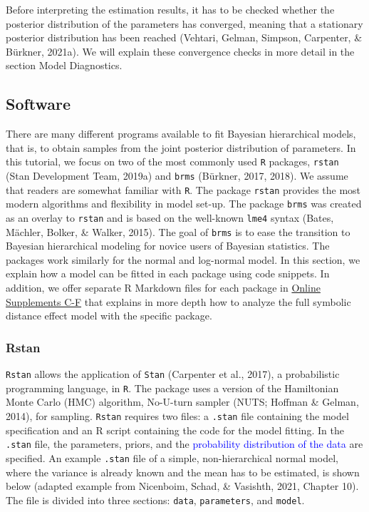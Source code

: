 \documentclass[
  english,
  doc,floatsintext]{apa6}
\begin{document}
Before interpreting the estimation results, it has to be checked whether the posterior distribution of the parameters has converged, meaning that a stationary posterior distribution has been reached (Vehtari, Gelman, Simpson, Carpenter, \& Bürkner, 2021a). We will explain these convergence checks in more detail in the section Model Diagnostics.

\hypertarget{software}{%
\subsection{Software}\label{software}}

There are many different programs available to fit Bayesian hierarchical models, that is, to obtain samples from the joint posterior distribution of parameters. In this tutorial, we focus on two of the most commonly used \texttt{R} packages, \texttt{rstan} (Stan Development Team, 2019a) and \texttt{brms} (Bürkner, 2017, 2018). We assume that readers are somewhat familiar with \texttt{R}. The package \texttt{rstan} provides the most modern algorithms and flexibility in model set-up. The package \texttt{brms} was created as an overlay to \texttt{rstan} and is based on the well-known \texttt{lme4} syntax (Bates, Mächler, Bolker, \& Walker, 2015). The goal of \texttt{brms} is to ease the transition to Bayesian hierarchical modeling for novice users of Bayesian statistics. The packages work similarly for the normal and log-normal model. In this section, we explain how a model can be fitted in each package using code snippets. In addition, we offer separate R Markdown files for each package in \href{https://github.com/MyrtheV/Bayesian-Hierarchical-Modelling-An-Introduction-and-Reassessment}{Online Supplements C-F} that explains in more depth how to analyze the full symbolic distance effect model with the specific package.

\hypertarget{rstan}{%
\subsubsection{Rstan}\label{rstan}}

\texttt{Rstan} allows the application of \texttt{Stan} (Carpenter et al., 2017), a probabilistic programming language, in \texttt{R}. The package uses a version of the Hamiltonian Monte Carlo (HMC) algorithm, No-U-turn sampler (NUTS; Hoffman \& Gelman, 2014), for sampling. \texttt{Rstan} requires two files: a \texttt{.stan} file containing the model specification and an R script containing the code for the model fitting. In the \texttt{.stan} file, the parameters, priors, and the \textcolor{blue}{probability distribution of the data} are specified. An example \texttt{.stan} file of a simple, non-hierarchical normal model, where the variance is already known and the mean has to be estimated, is shown below (adapted example from Nicenboim, Schad, \& Vasishth, 2021, Chapter 10). The file is divided into three sections: \texttt{data}, \texttt{parameters}, and \texttt{model}.
\end{document}
